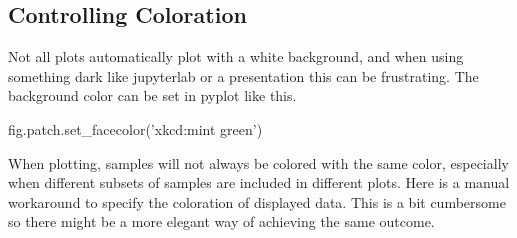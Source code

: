 \documentclass[]{book}
\newenvironment{Shaded}{\begin{snugshade}}{\end{snugshade}}
\newcommand{\NormalTok}[1]{#1}
\newcommand{\StringTok}[1]{\textcolor[rgb]{0.31,0.60,0.02}{#1}}
\begin{document}
\begin{Shaded}
\end{Shaded}

\hypertarget{controlling-coloration}{%
\subsection{Controlling Coloration}\label{controlling-coloration}}

Not all plots automatically plot with a white background, and when using something dark like jupyterlab or a presentation this can be frustrating. The background color can be set in pyplot like this.

\begin{Shaded}
\begin{Highlighting}[]
\NormalTok{fig.patch.set_facecolor(}\StringTok{'xkcd:mint green'}\NormalTok{)}
\end{Highlighting}
\end{Shaded}

When plotting, samples will not always be colored with the same color, especially when different subsets of samples are included in different plots. Here is a manual workaround to specify the coloration of displayed data. This is a bit cumbersome so there might be a more elegant way of achieving the same outcome.
\end{document}
